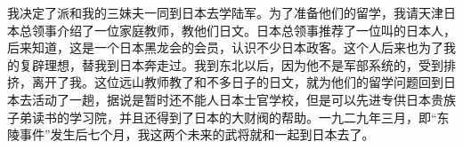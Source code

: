 我决定了派和我的三妹夫一同到日本去学陆军。为了准备他们的留学，我请天津日本总领事介绍了一位家庭教师，教他们日文。日本总领事推荐了一位叫的日本人，后来知道，这是一个日本黑龙会的会员，认识不少日本政客。这个人后来也为了我的复辟理想，替我到日本奔走过。我到东北以后，因为他不是军部系统的，受到排挤，离开了我。这位远山教师教了和不多日子的日文，就为他们的留学问题回到日本去活动了一趟，据说是暂时还不能人日本士官学校，但是可以先进专供日本贵族子弟读书的学习院，并且还得到了日本的大财阀的帮助。一九二九年三月，即“东陵事件”发生后七个月，我这两个未来的武将就和一起到日本去了。
